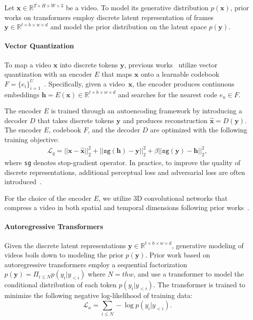 \documentclass[10pt,twocolumn,letterpaper]{article}
\newcommand{\cutparagraphup}{\vspace*{-0.1in}}
\begin{document}
Let $\mathbf{x} \in \mathbb{R}^{T \times H \times W \times 3}$ be a video.
To model its generative distribution $p(\mathbf{x})$, prior works on transformers employ discrete latent representation of frames $\mathbf{y} \in \mathbb{R}^{t \times h \times w \times d}$ and model the prior distribution on the latent space $p(\mathbf{y})$.
\cutparagraphup
\paragraph{Vector Quantization}
To map a video $\mathbf{x}$ into discrete tokens $\mathbf{y}$, previous works~\cite{TATS, NUWA, LVT, MMVID, VPVQVAE} utilize vector quantization with an encoder $E$ that maps $\mathbf{x}$ onto a learnable codebook $F=\{e_i\}_{i=1}^U$~\cite{VQVAE}.
Specifically, given a video~$\mathbf{x}$, the encoder produces continuous embeddings $\mathbf{h} = E(\mathbf{x}) \in \mathbb{R}^{t \times h \times w \times d}$ and searches for the nearest code $e_u\in F$.

The encoder $E$ is trained through an autoencoding framework by introducing a decoder $D$ that takes discrete tokens $\mathbf{y}$ and produces reconstruction $\hat{\mathbf{x}}=D(\mathbf{y})$.
The encoder $E$, codebook $F$, and the decoder $D$ are optimized with the following training objective:
\begin{gather}
    \mathcal{L}_q = ||\mathbf{x} - \hat{\mathbf{x}}||_2^2 + ||\texttt{sg}(\mathbf{h}) - \mathbf{y}||_2^2 + \beta ||\texttt{sg}(\mathbf{y}) - \mathbf{h}||^2_2,
\end{gather}
where \texttt{sg} denotes stop-gradient operator.
In practice, to improve the quality of discrete representations, additional perceptual loss and adversarial loss are often introduced~\cite{VQGAN}.

For the choice of the encoder $E$, we utilize 3D convolutional networks that compress a video in both spatial and temporal dimensions following prior works~\cite{videoGPT, TATS}.








\paragraph{Autoregressive Transformers}
Given the discrete latent representations $\mathbf{y} \in \mathbb{R}^{t \times h \times w \times d}$, generative modeling of videos boils down to modeling the prior $p(\mathbf{y})$.
Prior work based on autoregressive transformers employ a sequential factorization $p(\mathbf{y})=\Pi_{i\leq N}p(y_i|y_{<i})$ where $N = thw$, and use a transformer to model the conditional distribution of each token $p(y_i|y_{<i})$.
The transformer is trained to minimize the following negative log-likelihood of training data:
\begin{equation}\label{eq:autoregressive}
    \mathcal{L}_a = \sum_{i\leq N} -\log{p(y_i|y_{<i})}.
\end{equation}
\end{document}
